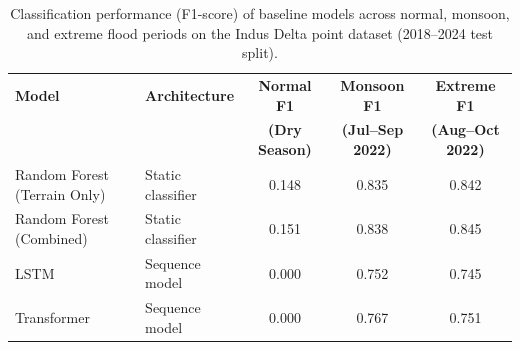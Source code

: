 \begin{table}[t]
\caption{Classification performance (F1-score) of baseline models across normal, monsoon, and extreme flood periods on the Indus Delta point dataset (2018--2024 test split).}
\label{tab:model_results}
\centering
\small
\begin{tabular}{p{4.2cm} p{2.8cm} c c c}
\hline
\textbf{Model} & \textbf{Architecture} & \textbf{Normal F1} & \textbf{Monsoon F1} & \textbf{Extreme F1} \\
 & & \textbf{(Dry Season)} & \textbf{(Jul--Sep 2022)} & \textbf{(Aug--Oct 2022)} \\
\hline
Random Forest (Terrain Only) & Static classifier   & 0.148 & 0.835 & 0.842 \\
Random Forest (Combined)     & Static classifier   & 0.151 & 0.838 & 0.845 \\
LSTM                         & Sequence model      & 0.000 & 0.752 & 0.745 \\
Transformer                  & Sequence model      & 0.000 & 0.767 & 0.751 \\
\hline
\end{tabular}
\end{table}
